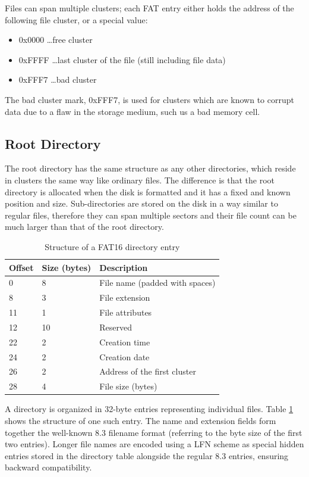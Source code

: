 Files can span multiple clusters; each \gls{FAT} entry either holds the address of the following file cluster, or a special value:

\begin{itemize}[nosep]
	\item 0x0000 \dots free cluster
	\item 0xFFFF \dots last cluster of the file (still including file data)
	\item 0xFFF7 \dots bad cluster
\end{itemize}

The bad cluster mark, 0xFFF7, is used for clusters which are known to corrupt data due to a flaw in the storage medium, such us a bad memory cell.

\subsection{Root Directory}

The root directory has the same structure as any other directories, which reside in clusters the same way like ordinary files. The difference is that the root directory is allocated when the disk is formatted and it has a fixed and known position and size. Sub-directories are stored on the disk in a way similar to regular files, therefore they can span multiple sectors and their file count can be much larger than that of the root directory.

\begin{table}
	\centering
	\begin{tabular}{lll}
		\toprule
		\textbf{Offset} & \textbf{Size (bytes)}  & \textbf{Description}\\
		\midrule
		0 & 8 & File name (padded with spaces) \\
		8 & 3 & File extension \\
		11 & 1 & File attributes \\
		12 & 10 & Reserved \\
		22 & 2 & Creation time \\
		24 & 2 & Creation date \\
		26 & 2 & Address of the first cluster \\
		28 & 4 & File size (bytes) \\
		\bottomrule
	\end{tabular}
	\caption{\label{tab:fat16-dir-entry}Structure of a FAT16 directory entry}
\end{table}

A directory is organized in 32-byte entries representing individual files. Table \ref{tab:fat16-dir-entry} shows the structure of one such entry. The name and extension fields form together the well-known 8.3 filename format (referring to the byte size of the first two entries). Longer file names are encoded using a \gls{LFN} scheme \cite{fat-lfn} as special hidden entries stored in the directory table alongside the regular 8.3 entries, ensuring backward compatibility.

